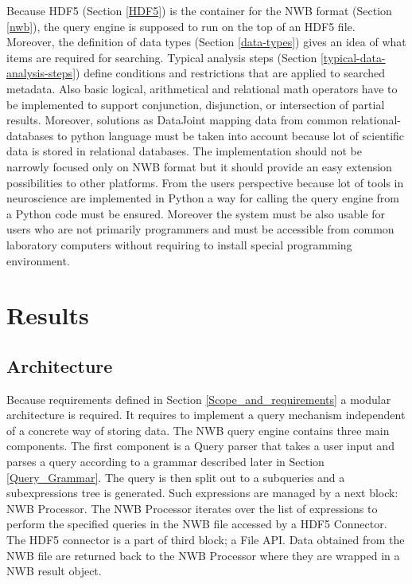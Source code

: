 \documentclass[utf8]{frontiersSCNS} %
\begin{document}
Because HDF5 (Section \ref{HDF5}) is the container for the NWB format (Section \ref{nwb}), the query engine is supposed to run on the top of an HDF5 file. Moreover, the definition of data types (Section \ref{data-types}) gives an idea of what items are required for searching. Typical analysis steps (Section \ref{typical-data-analysis-steps}) define conditions and restrictions that are applied to searched metadata. Also basic logical, arithmetical and relational math operators have to be implemented to support conjunction, disjunction, or intersection of partial results. Moreover, solutions as DataJoint mapping data from common relational-databases to python language must be taken into account because lot of scientific data is stored in relational databases. The implementation should not be narrowly focused only on NWB format but it should provide an easy extension possibilities to other platforms. From the users perspective because lot of tools in neuroscience are implemented in Python a way for calling the query engine from a Python code must be ensured. Moreover the system must be also usable for users who are not primarily programmers and must be accessible from common laboratory computers without requiring to install special programming environment.

\section{Results}
\label{results}


\subsection{Architecture}
\label{Architecture}

Because requirements defined in Section \ref{Scope_and_requirements} a modular architecture is required. It requires to implement a query mechanism independent of a concrete way of storing data. The NWB query engine contains three main components. The first component is a Query parser that takes a user input and parses a query according to a grammar described later in Section \ref{Query_Grammar}. The query is then split out to a subqueries and a subexpressions tree is generated. Such expressions are managed by a next block: NWB Processor. The NWB Processor iterates over the list of expressions to perform the specified queries  in the NWB file accessed by a HDF5 Connector. The HDF5 connector is a part of third block; a File API. Data obtained from the NWB file are returned back to the NWB Processor where they are wrapped in a NWB result object.
\end{document}

